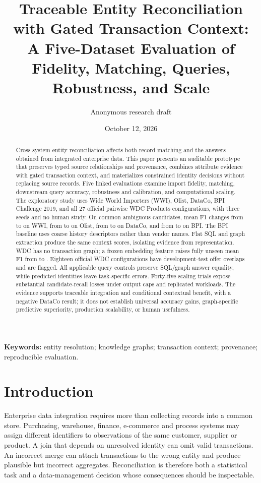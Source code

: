 \documentclass[11pt,letterpaper]{article}
\title{Traceable Entity Reconciliation with Gated Transaction Context:\\A Five-Dataset Evaluation of Fidelity, Matching, Queries, Robustness, and Scale}
\author{Anonymous research draft}
\date{October 12, 2026}
\begin{document}
\maketitle
\begin{abstract}
Cross-system entity reconciliation affects both record matching and the answers obtained from integrated enterprise data. This paper presents an auditable prototype that preserves typed source relationships and provenance, combines attribute evidence with gated transaction context, and materializes constrained identity decisions without replacing source records. Five linked evaluations examine import fidelity, matching, downstream query accuracy, robustness and calibration, and computational scaling. The exploratory study uses Wide World Importers (WWI), Olist, DataCo, BPI Challenge 2019, and all 27 official pairwise WDC Products configurations, with three seeds and no human study. On common ambiguous candidates, mean F1 changes from \FWwiAttr{} to \FWwiGraph{} on WWI, from \FOlistAttr{} to \FOlistGraph{} on Olist, from \FDataCoAttr{} to \FDataCoGraph{} on DataCo, and from \FBpiAttr{} to \FBpiGraph{} on BPI. The BPI baseline uses coarse history descriptors rather than vendor names. Flat SQL and graph extraction produce the same context scores, isolating evidence from representation. WDC has no transaction graph; a frozen embedding feature raises fully unseen mean F1 from \WdcAttr{} to \WdcAug{}. Eighteen official WDC configurations have development-test offer overlaps and are flagged. All applicable query controls preserve SQL/graph answer equality, while predicted identities leave task-specific errors. Forty-five scaling trials expose substantial candidate-recall losses under output caps and replicated workloads. The evidence supports traceable integration and conditional contextual benefit, with a negative DataCo result; it does not establish universal accuracy gains, graph-specific predictive superiority, production scalability, or human usefulness.
\end{abstract}
\noindent\textbf{Keywords:} entity resolution; knowledge graphs; transaction context; provenance; reproducible evaluation.

\section{Introduction}
Enterprise data integration requires more than collecting records into a common store. Purchasing, warehouse, finance, e-commerce and process systems may assign different identifiers to observations of the same customer, supplier or product. A join that depends on unresolved identity can omit valid transactions. An incorrect merge can attach transactions to the wrong entity and produce plausible but incorrect aggregates. Reconciliation is therefore both a statistical task and a data-management decision whose consequences should be inspectable.
\end{document}
